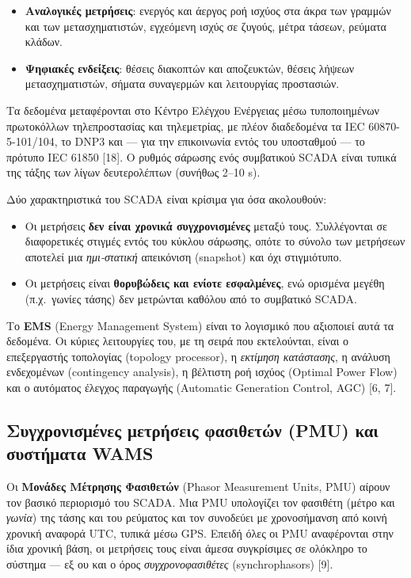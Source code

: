 \begin{itemize}
\item \textbf{Αναλογικές μετρήσεις}: ενεργός και άεργος ροή ισχύος στα άκρα των γραμμών και των
      μετασχηματιστών, εγχεόμενη ισχύς σε ζυγούς, μέτρα τάσεων, ρεύματα κλάδων.
\item \textbf{Ψηφιακές ενδείξεις}: θέσεις διακοπτών και αποζευκτών, θέσεις λήψεων μετασχηματιστών,
      σήματα συναγερμών και λειτουργίας προστασιών.
\end{itemize}

Τα δεδομένα μεταφέρονται στο Κέντρο Ελέγχου Ενέργειας μέσω τυποποιημένων πρωτοκόλλων τηλεπροστασίας
και τηλεμετρίας, με πλέον διαδεδομένα τα IEC 60870-5-101/104, το DNP3 και — για την επικοινωνία
εντός του υποσταθμού — το πρότυπο IEC 61850 [18]. Ο ρυθμός σάρωσης ενός συμβατικού SCADA είναι
τυπικά της τάξης των λίγων δευτερολέπτων (συνήθως 2–10 s).

Δύο χαρακτηριστικά του SCADA είναι κρίσιμα για όσα ακολουθούν:

\begin{itemize}
\item Οι μετρήσεις \textbf{δεν είναι χρονικά συγχρονισμένες} μεταξύ τους. Συλλέγονται σε
      διαφορετικές στιγμές εντός του κύκλου σάρωσης, οπότε το σύνολο των μετρήσεων αποτελεί μια
      \emph{ημι-στατική} απεικόνιση (snapshot) και όχι στιγμιότυπο.
\item Οι μετρήσεις είναι \textbf{θορυβώδεις και ενίοτε εσφαλμένες}, ενώ ορισμένα μεγέθη
      (π.χ.\ γωνίες τάσης) δεν μετρώνται καθόλου από το συμβατικό SCADA.
\end{itemize}

Το \textbf{EMS} (Energy Management System) είναι το λογισμικό που αξιοποιεί αυτά τα δεδομένα.
Οι κύριες λειτουργίες του, με τη σειρά που εκτελούνται, είναι ο επεξεργαστής τοπολογίας
(topology processor), η \emph{εκτίμηση κατάστασης}, η ανάλυση ενδεχομένων (contingency analysis),
η βέλτιστη ροή ισχύος (Optimal Power Flow) και ο αυτόματος έλεγχος παραγωγής (Automatic Generation
Control, AGC) [6, 7].

\subsection{Συγχρονισμένες μετρήσεις φασιθετών (PMU) και συστήματα WAMS}

Οι \textbf{Μονάδες Μέτρησης Φασιθετών} (Phasor Measurement Units, PMU) αίρουν τον βασικό
περιορισμό του SCADA. Μια PMU υπολογίζει τον φασιθέτη (μέτρο και \emph{γωνία}) της τάσης και του
ρεύματος και τον συνοδεύει με χρονοσήμανση από κοινή χρονική αναφορά UTC, τυπικά μέσω GPS. Επειδή
όλες οι PMU αναφέρονται στην ίδια χρονική βάση, οι μετρήσεις τους είναι άμεσα συγκρίσιμες σε
ολόκληρο το σύστημα — εξ ου και ο όρος \emph{συγχρονοφασιθέτες} (synchrophasors) [9].

